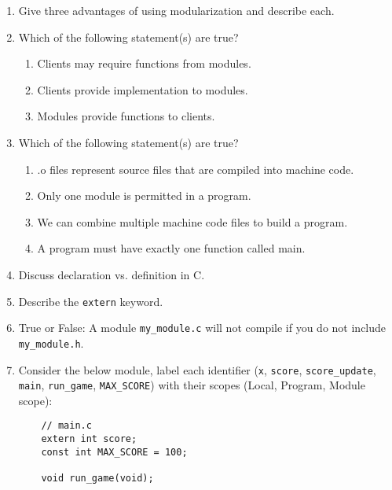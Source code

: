 \documentclass{article}
\begin{document}
\begin{enumerate}
    \item Give three advantages of using modularization and describe each.
    \vspace{16mm}
    \item Which of the following statement(s) are true?
    \begin{enumerate}[label=\alph*.]
        \item Clients may require functions from modules.
        \item Clients provide implementation to modules.
        \item Modules provide functions to clients.
    \end{enumerate}
    \item Which of the following statement(s) are true?
    \begin{enumerate}[label=\alph*.]
        \item .o files represent source files that are compiled into machine code.
        \item Only one module is permitted in a program.
        \item We can combine multiple machine code files to build a program.
        \item A program must have exactly one function called main.
    \end{enumerate}
    \item Discuss declaration vs. definition in C.
    \vspace{16mm}
    \item Describe the \texttt{extern} keyword.
    \vspace{16mm}
    \item True or False: A module \texttt{my\_module.c} will not compile if you do not include \texttt{my\_module.h}.
    
 
\item Consider the below module, label each identifier (\texttt{x}, \texttt{score}, \texttt{score\_update}, \texttt{main}, \texttt{run\_game}, \texttt{MAX\_SCORE}) with their scopes (Local, Program, Module scope):
    
    \noindent
    
    \begin{minipage}{.5\textwidth}
    \begin{lstlisting}
    // main.c
    extern int score;
    const int MAX_SCORE = 100;
    
    void run_game(void);
    

\end{lstlisting}
\end{minipage}
\end{enumerate}
\end{document}
